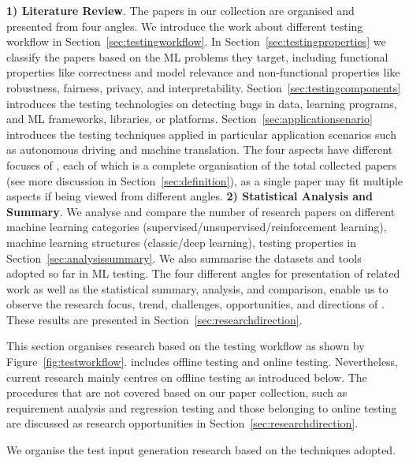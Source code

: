 \noindent\textbf{1) Literature Review}.
The papers in our collection are organised and presented from four angles.
We introduce the work about different testing workflow in Section~\ref{sec:testingworkflow}.
In Section~\ref{sec:testingproperties} we classify the papers based on the ML problems they target, including functional properties like correctness and model relevance and non-functional properties like robustness, fairness, privacy, and interpretability.
Section~\ref{sec:testingcomponents} introduces the testing technologies on detecting bugs in data, learning programs, and ML frameworks, libraries, or platforms.  
Section~\ref{sec:applicationsenario} introduces the testing techniques applied in particular application scenarios such as autonomous driving and machine translation.
The four aspects have different focuses of \mlt{}, each of which is a complete organisation of the total collected papers (see more discussion in Section~\ref{sec:definition}), as a single \mlt{} paper may fit multiple aspects if being viewed from different angles.
\noindent\textbf{2)  Statistical Analysis and Summary}.
We analyse and compare the number of research papers on different machine learning categories (supervised/unsupervised/reinforcement learning), machine learning structures (classic/deep learning), testing properties in Section~\ref{sec:analysissummary}.
We also summarise the datasets and tools adopted so far in ML testing.
The four different angles for presentation of related work as well as the statistical summary, analysis, and comparison, 
enable us to observe the research focus, trend, challenges, opportunities, and directions of \mlt{}.
These results are presented in Section~\ref{sec:researchdirection}.

\label{sec:testingworkflow}
This section organises \mlt{} research based on the testing workflow as shown by Figure~\ref{fig:testworkflow}.
\mlt{} includes offline testing and online testing.
Nevertheless, current research mainly centres on offline testing as introduced below. 
The procedures that are not covered based on our paper collection, such as requirement analysis and regression testing and those belonging to online testing
are discussed as research opportunities in Section~\ref{sec:researchdirection}.

\label{sec:input}
We organise the test input generation research based on the techniques adopted.

